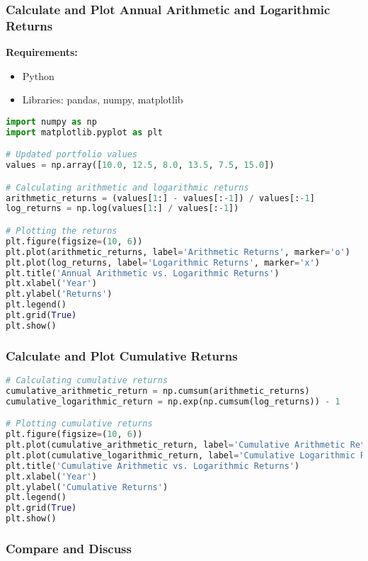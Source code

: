 \documentclass{article}
\begin{document}
\subsubsection{Calculate and Plot Annual Arithmetic and Logarithmic Returns}

\textbf{Requirements:}
\begin{itemize}
    \item Python
    \item Libraries: pandas, numpy, matplotlib
\end{itemize}

\begin{lstlisting}[language=Python]
import numpy as np
import matplotlib.pyplot as plt

# Updated portfolio values
values = np.array([10.0, 12.5, 8.0, 13.5, 7.5, 15.0])

# Calculating arithmetic and logarithmic returns
arithmetic_returns = (values[1:] - values[:-1]) / values[:-1]
log_returns = np.log(values[1:] / values[:-1])

# Plotting the returns
plt.figure(figsize=(10, 6))
plt.plot(arithmetic_returns, label='Arithmetic Returns', marker='o')
plt.plot(log_returns, label='Logarithmic Returns', marker='x')
plt.title('Annual Arithmetic vs. Logarithmic Returns')
plt.xlabel('Year')
plt.ylabel('Returns')
plt.legend()
plt.grid(True)
plt.show()
\end{lstlisting}

\subsubsection{Calculate and Plot Cumulative Returns}

\begin{lstlisting}[language=Python]
# Calculating cumulative returns
cumulative_arithmetic_return = np.cumsum(arithmetic_returns)
cumulative_logarithmic_return = np.exp(np.cumsum(log_returns)) - 1

# Plotting cumulative returns
plt.figure(figsize=(10, 6))
plt.plot(cumulative_arithmetic_return, label='Cumulative Arithmetic Returns', marker='o')
plt.plot(cumulative_logarithmic_return, label='Cumulative Logarithmic Returns', marker='x')
plt.title('Cumulative Arithmetic vs. Logarithmic Returns')
plt.xlabel('Year')
plt.ylabel('Cumulative Returns')
plt.legend()
plt.grid(True)
plt.show()
\end{lstlisting}

\subsubsection{Compare and Discuss}
\end{document}

